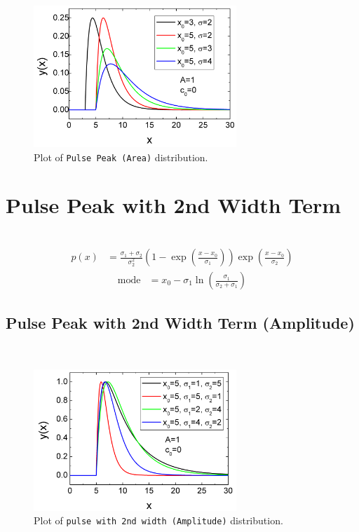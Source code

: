 \begin{figure}[htb]
\begin{center}
\includegraphics[width=0.6824\textwidth]{PulseArea.png}
\end{center}
\caption{Plot of \texttt{Pulse Peak (Area)} distribution.}
\label{fig:PulseArea}
\end{figure}

\clearpage
\section{Pulse Peak with 2nd Width Term} ~\\
\label{sec:pulsewith2ndwidth}
\begin{align}
p(x) &= \frac{\sigma_1+\sigma_2}{\sigma_2^2} \left(1-\exp\left(\frac{x-x_0}{\sigma_1}\right)\right) \exp\left(\frac{x-x_0}{\sigma_2}\right)
\end{align}
\begin{align}
\mbox{mode} &= x_0 - \sigma_1 \ln\left(\frac{\sigma_1}{\sigma_2+\sigma_1}\right)
\end{align}

\subsection{Pulse Peak with 2nd Width Term (Amplitude)} ~\\
\label{sec:pulsewith2ndwidthAmplitude}

\begin{figure}[htb]
\begin{center}
\includegraphics[width=0.6824\textwidth]{Pulse2ndWidthAmplitude.png}
\end{center}
\caption{Plot of \texttt{pulse with 2nd width (Amplitude)} distribution.}
\label{fig:Pulse2ndWidthAmplitude}
\end{figure}

